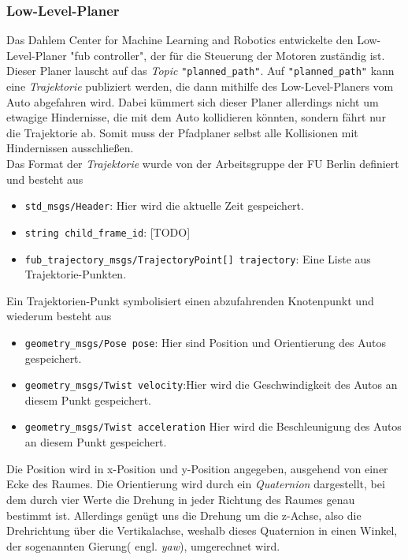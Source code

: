 \subsubsection{Low-Level-Planer}
Das Dahlem Center for Machine Learning and Robotics entwickelte den Low-Level-Planer "fub controller", der für die Steuerung der Motoren zuständig ist.
Dieser Planer lauscht auf das \textit{Topic} \verb|"planned_path"|. Auf \verb|"planned_path"| kann eine \textit{Trajektorie} publiziert werden, die dann mithilfe des Low-Level-Planers vom Auto abgefahren wird. Dabei kümmert sich dieser Planer allerdings nicht um etwagige Hindernisse, die mit dem Auto kollidieren könnten, sondern fährt nur die Trajektorie ab. Somit muss der Pfadplaner selbst alle Kollisionen mit Hindernissen ausschließen. \\
Das Format der \textit{Trajektorie} wurde von der Arbeitsgruppe der FU Berlin definiert und besteht aus
\begin{itemize}
\item \verb|std_msgs/Header|: Hier wird die aktuelle Zeit gespeichert.
\item \verb|string child_frame_id|: [TODO]
\item \verb|fub_trajectory_msgs/TrajectoryPoint[] trajectory|: Eine Liste aus Trajektorie-Punkten.
\end{itemize}
Ein Trajektorien-Punkt symbolisiert einen abzufahrenden Knotenpunkt und wiederum besteht aus
\begin{itemize}
\item \verb|geometry_msgs/Pose pose|: Hier sind Position und Orientierung des Autos gespeichert.
\item \verb|geometry_msgs/Twist velocity|:Hier wird die Geschwindigkeit des Autos an diesem Punkt gespeichert.
\item \verb|geometry_msgs/Twist acceleration| Hier wird die Beschleunigung des Autos an diesem Punkt gespeichert.
\end{itemize}
Die Position wird in x-Position und y-Position angegeben, ausgehend von einer Ecke des Raumes. Die Orientierung wird durch ein \textit{Quaternion} dargestellt, bei dem durch vier Werte die Drehung in jeder Richtung des Raumes genau bestimmt ist. Allerdings genügt uns die Drehung um die z-Achse, also die Drehrichtung über die Vertikalachse, weshalb dieses Quaternion in einen Winkel, der sogenannten Gierung( engl. \textit{yaw}), umgerechnet wird.
\\

